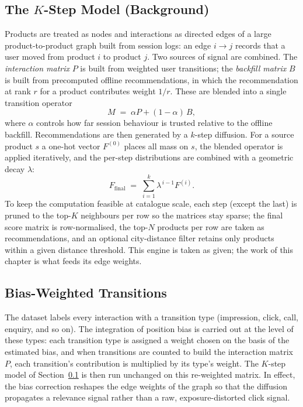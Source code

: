 \subsection{The \texorpdfstring{$K$}{K}-Step Model (Background)}
\label{sec:pb-kstep-bg}
Products are treated as nodes and interactions as directed edges of a large
product-to-product graph built from session logs: an edge $i\to j$ records that
a user moved from product $i$ to product $j$. Two sources of signal are
combined. The \emph{interaction matrix} $P$ is built from weighted user
transitions; the \emph{backfill matrix} $B$ is built from precomputed offline
recommendations, in which the recommendation at rank $r$ for a product
contributes weight $1/r$. These are blended into a single transition operator
\begin{equation}
  \label{eq:blend}
  M \;=\; \alpha P + (1-\alpha)\,B,
\end{equation}
where $\alpha$ controls how far session behaviour is trusted relative to the
offline backfill. Recommendations are then generated by a $k$-step diffusion.
For a source product $s$ a one-hot vector $F^{(0)}$ places all mass on $s$, the
blended operator is applied iteratively, and the per-step distributions are
combined with a geometric decay $\lambda$:
\begin{equation}
  \label{eq:diffusion}
  F_{\text{final}} \;=\; \sum_{i=1}^{k} \lambda^{\,i-1} F^{(i)} .
\end{equation}
To keep the computation feasible at catalogue scale, each step (except the
last) is pruned to the top-$K$ neighbours per row so the matrices stay sparse;
the final score matrix is row-normalised, the top-$N$ products per row are taken
as recommendations, and an optional city-distance filter retains only products
within a given distance threshold. This engine is taken as given; the work of
this chapter is what feeds its edge weights.

\subsection{Bias-Weighted Transitions}
\label{sec:pb-weighting}
The dataset labels every interaction with a transition type (impression, click,
call, enquiry, and so on). The integration of position bias is carried out at
the level of these types: each transition type is assigned a weight chosen on
the basis of the estimated bias, and when transitions are counted to build the
interaction matrix $P$, each transition's contribution is multiplied by its
type's weight. The $K$-step model of Section~\ref{sec:pb-kstep-bg} is then run
unchanged on this re-weighted matrix. In effect, the bias correction reshapes
the edge weights of the graph so that the diffusion propagates a relevance
signal rather than a raw, exposure-distorted click signal.

